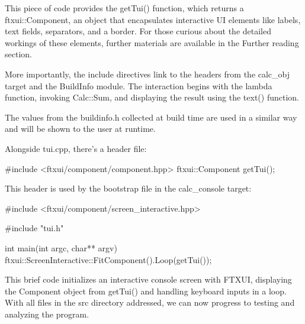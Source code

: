 This piece of code provides the getTui() function, which returns a ftxui::Component, an object that encapsulates interactive UI elements like labels, text fields, separators, and a border. For those curious about the detailed workings of these elements, further materials are available in the Further reading section.

More importantly, the include directives link to the headers from the calc\_obj target and the BuildInfo module. The interaction begins with the lambda function, invoking Calc::Sum, and displaying the result using the text() function.

The values from the buildinfo.h collected at build time are used in a similar way and will be shown to the user at runtime.

Alongside tui.cpp, there’s a header file:


\begin{cpp}
#include <ftxui/component/component.hpp>
ftxui::Component getTui();
\end{cpp}

This header is used by the bootstrap file in the calc\_console target:


\begin{cpp}
#include <ftxui/component/screen_interactive.hpp>

#include "tui.h"

int main(int argc, char** argv) {
    ftxui::ScreenInteractive::FitComponent().Loop(getTui());
}
\end{cpp}

This brief code initializes an interactive console screen with FTXUI, displaying the Component object from getTui() and handling keyboard inputs in a loop. With all files in the src directory addressed, we can now progress to testing and analyzing the program.


























